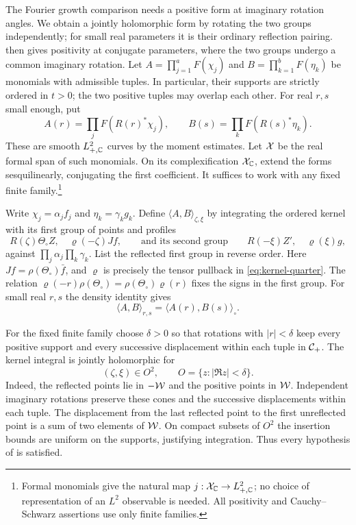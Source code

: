 The Fourier growth comparison needs a positive form at imaginary
rotation angles. We obtain a jointly holomorphic form by rotating the
two groups independently; for small real parameters it is their
ordinary reflection pairing.  then gives
positivity at conjugate parameters, where the two groups undergo a
common imaginary rotation. Let $A=\prod_{j=1}^aF(\chi_j)$ and
$B=\prod_{k=1}^bF(\eta_k)$ be monomials with admissible tuples.
In particular, their supports are strictly ordered in $t>0$;
the two positive tuples may overlap each other.
For real $r,s$ small enough, put
\begin{equation}
 A(r)=\prod_jF(R(r)^*\chi_j),\qquad
 B(s)=\prod_kF(R(s)^*\eta_k).
\end{equation}
These are smooth $L^2_{+,\mathbb{C}}$ curves by the moment estimates.
Let $\mathcal{X}$ be the real formal span of such monomials. On its
complexification $\mathcal{X}_{\mathbb{C}}$, extend the forms sesquilinearly,
conjugating the first coefficient.
It suffices to work with any fixed finite family.\footnote{Formal
monomials give the natural map $j:\mathcal{X}_{\mathbb{C}}\to L^2_{+,\mathbb{C}}$;
no choice of representation of an $L^2$ observable is needed. All
positivity and Cauchy--Schwarz assertions use only finite families.}

Write $\chi_j=\alpha_jf_j$ and $\eta_k=\gamma_kg_k$. Define
$\langle A,B\rangle_{\zeta,\xi}$ by integrating the ordered kernel
with its first group of points and profiles
\begin{equation}\label{eq:independent-rotations}
 R(\zeta)\Theta_\circ Z,\quad\varrho(-\zeta)Jf,
 \qquad\text{and its second group}\qquad
 R(-\xi)Z',\quad\varrho(\xi)g,
\end{equation}
against $\prod_j\alpha_j\prod_k\gamma_k$. List the reflected first
group in reverse order. Here $Jf=\rho(\Theta_\circ)\bar f$, and
$\varrho$ is precisely the tensor pullback in
\eqref{eq:kernel-quarter}. The relation
$\varrho(-r)\rho(\Theta_\circ)=\rho(\Theta_\circ)\varrho(r)$
fixes the signs in the first group. For small real $r,s$ the density
identity gives
\begin{equation}
 \langle A,B\rangle_{r,s}=\langle A(r),B(s)\rangle_\circ.
\end{equation}

For the fixed finite family choose $\delta>0$ so that rotations
with $|r|<\delta$ keep every positive support and every successive
displacement within each tuple in $\mathcal{C}_+$. The kernel integral is
jointly holomorphic for
\begin{equation}
 (\zeta,\xi)\in O^2,\qquad O=\{z:|\Re z|<\delta\}.
\end{equation}
Indeed, the reflected points lie in $-\mathcal{W}$ and the positive points
in $\mathcal{W}$. Independent imaginary rotations preserve these cones
and the successive displacements within each tuple. The displacement
from the last reflected point to the first unreflected point is a
sum of two elements of $\mathcal{W}$. On compact subsets of $O^2$ the insertion bounds are
uniform on the supports, justifying integration. Thus every
hypothesis of  is satisfied.

